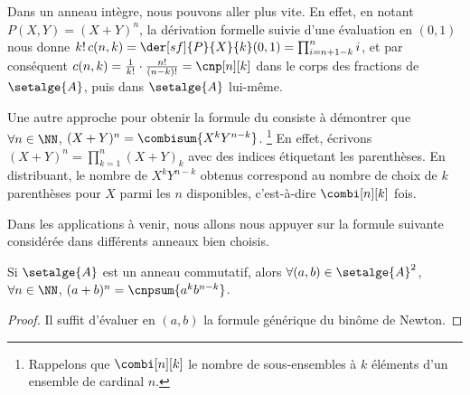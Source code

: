 \begin{remark} \label{bino-id-formal-quick}
    Dans un anneau intègre, nous pouvons aller plus vite.
    En effet,
    en notant $P(X,Y) = (X + Y)^n$,
    la dérivation formelle suivie d'une évaluation en $(0,1)$ nous donne
    $k! \, c(n,k) = \der[sf]{P}{X}{k}(0,1) = \prod_{i=n+1-k}^{n} i$,
    et par conséquent
    $c(n,k) = \frac{1}{k!} \cdot \frac{n!}{(n-k)!} = \cnp[n][k]$ 
    dans le corps des fractions de $\setalge{A}$, 
    puis dans $\setalge{A}$ lui-même.
\end{remark}


\begin{remark} \label{bino-id-formal-combi}
    Une autre approche pour obtenir la formule du  consiste à démontrer que
    $\forall n \in \NN$,
	$(X + Y)^n = \combisum{X^k Y^{n-k}}$.%
    \footnote{
        Rappelons que $\combi[n][k]$ le nombre de sous-ensembles à $k$ éléments d'un ensemble de cardinal $n$.
    }
    En effet,
    écrivons 
    $(X + Y)^n = \prod_{k=1}^{n} (X + Y)_k$ avec des indices étiquetant les parenthèses.
    En distribuant, le nombre de $X^k Y^{n-k}$ obtenus correspond au nombre de choix de $k$ parenthèses pour $X$ parmi les $n$ disponibles, c'est-à-dire $\combi[n][k]$ fois.
\end{remark}




Dans les applications à venir, nous allons nous appuyer sur la formule suivante considérée dans différents anneaux bien choisis.


\begin{fact} \label{bino-id-a-b}
	Si $\setalge{A}$ est un anneau commutatif,
	alors
	$\forall (a, b) \in \setalge{A}^2$,
	$\forall n \in \NN$,
	$(a + b)^n = \cnpsum{a^k b^{n-k}}$.
\end{fact}


\begin{proof}
	Il suffit d'évaluer en $(a, b)$ la formule générique du binôme de Newton.
\end{proof}
